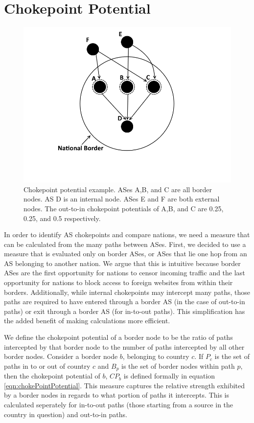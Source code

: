 \documentclass[10pt, conference, letterpaper]{IEEEtran}
\begin{document}
\section{Chokepoint Potential}

\begin{figure}
	\centering
	\includegraphics[width=\linewidth]{chokepoint}
	\caption{Chokepoint potential example. ASes A,B, and C are all border nodes. 
						AS D is an internal node. ASes E and F are both external nodes.
						The out-to-in chokepoint potentials of A,B, and C are 0.25, 0.25, and 0.5 respectively.}\label{fig:chokepoint}
\end{figure}

In order to identify AS chokepoints and compare nations, we need a measure that can be calculated from the many paths between
ASes. First, we decided to use a measure that is evaluated only on border ASes, or ASes that lie one hop from an AS belonging to another nation. 
We argue that this is intuitive because border
ASes are the first opportunity for nations to censor incoming traffic and the last opportunity for nations to block access to
foreign websites from within their borders. Additionally, while internal chokepoints may intercept many paths, those paths are required
to have entered through a border AS (in the case of out-to-in paths) or exit through a border AS (for in-to-out paths). This simplification has
the added benefit of making calculations more efficient.

\par
We define the chokepoint potential of a border node to be the ratio of paths intercepted by that border node
to the number of paths intercepted by all other border nodes. Consider a border node $b$, belonging to country $c$.
If $P_c$ is the set of paths in to or out of country $c$ and $B_p$ is the set of border nodes within path $p$, then the
chokepoint potential of $b$, $CP_b$ is defined formally in equation \ref{eqn:chokePointPotential}. This measure captures
the relative strength exhibited by a border nodes in regards to what portion of paths it intercepts. This is calculated
seperately for in-to-out paths (those starting from a source in the country in question) and out-to-in paths.
\end{document}
